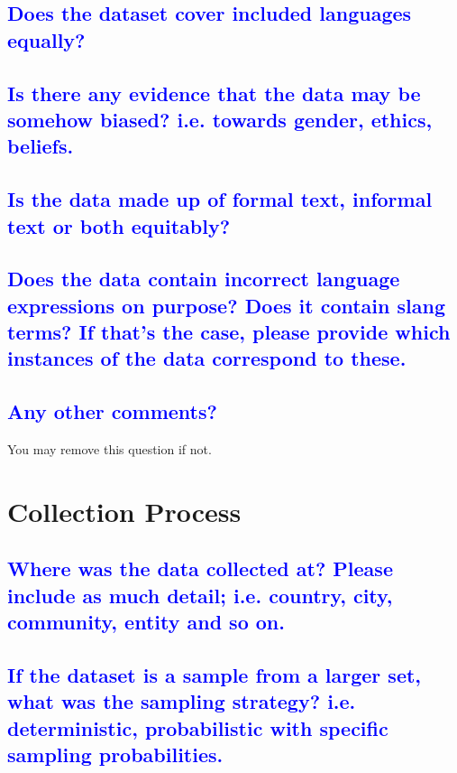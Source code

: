 \documentclass[letterpaper, 10 pt, conference]{ieeeconf}  %
\begin{document}
\textcolor{blue}{\subsection{Does the dataset cover included languages equally?}}
\lipsum[1]

\textcolor{blue}{\subsection{Is there any evidence that the data may be somehow biased? i.e. towards gender, ethics, beliefs.}}
\lipsum[1]

\textcolor{blue}{\subsection{Is the data made up of formal text, informal text or both equitably?}}
\lipsum[1]

\textcolor{blue}{\subsection{Does the data contain incorrect language expressions on purpose? Does it contain slang terms? If that’s the case, please provide which instances of the data correspond to these.}}
\lipsum[1]

\textcolor{blue}{\subsection{Any other comments?}}
You may remove this question if not.
\\



\section{Collection Process}

\textcolor{blue}{\subsection{Where was the data collected at? Please include as much detail; i.e. country, city, community, entity and so on. 
}}
\lipsum[1]

\textcolor{blue}{\subsection{If the  dataset is a sample from a larger set, what was the sampling strategy? i.e. deterministic, probabilistic with specific sampling probabilities.}}
\lipsum[1]
\end{document}

